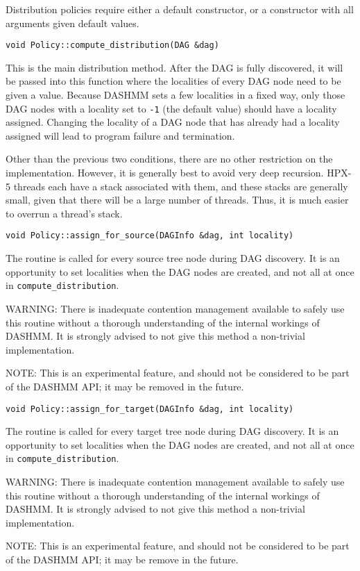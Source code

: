 \noindent
Distribution policies require either a default constructor, or a constructor
with all arguments given default values.

\begin{lstlisting}
void Policy::compute_distribution(DAG &dag)
\end{lstlisting}

\noindent
This is the main distribution method. After the DAG is fully discovered, it will
be passed into this function where the localities of every DAG node need to be
given a value. Because DASHMM sets a few localities in a fixed way, only those
DAG nodes with a locality set to \texttt{-1} (the default value) should have
a locality assigned. Changing the locality of a DAG node that has already had
a locality assigned will lead to program failure and termination.

Other than the previous two conditions, there are no other restriction on the
implementation. However, it is generally best to avoid very deep recursion.
HPX-5 threads each have a stack associated with them, and these stacks are
generally small, given that there will be a large number of threads. Thus, it
is much easier to overrun a thread's stack.

\begin{lstlisting}
void Policy::assign_for_source(DAGInfo &dag, int locality)
\end{lstlisting}

\noindent
The routine is called for every source tree node during DAG discovery. It is an
opportunity to set localities when the DAG nodes are created, and not all at
once in \texttt{compute\_distribution}.

WARNING: There is inadequate contention management available to safely use this
routine without a thorough understanding of the internal workings of DASHMM.
It is strongly advised to not give this method a non-trivial implementation.

NOTE: This is an experimental feature, and should not be considered to be part
of the DASHMM API; it may be removed in the future.

\begin{lstlisting}
void Policy::assign_for_target(DAGInfo &dag, int locality)
\end{lstlisting}

\noindent
The routine is called for every target tree node during DAG discovery. It is an
opportunity to set localities when the DAG nodes are created, and not all at
once in \texttt{compute\_distribution}.

WARNING: There is inadequate contention management available to safely use this
routine without a thorough understanding of the internal workings of DASHMM.
It is strongly advised to not give this method a non-trivial implementation.

NOTE: This is an experimental feature, and should not be considered to be part
of the DASHMM API; it may be remove in the future.
